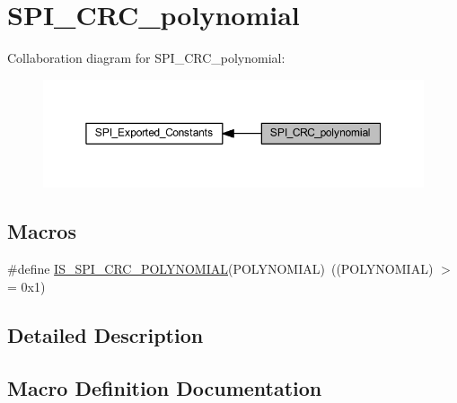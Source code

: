 \hypertarget{group___s_p_i___c_r_c__polynomial}{}\section{S\+P\+I\+\_\+\+C\+R\+C\+\_\+polynomial}
\label{group___s_p_i___c_r_c__polynomial}
Collaboration diagram for S\+P\+I\+\_\+\+C\+R\+C\+\_\+polynomial\+:
\nopagebreak
\begin{figure}[H]
\begin{center}
\leavevmode
\includegraphics[width=350pt]{group___s_p_i___c_r_c__polynomial}
\end{center}
\end{figure}
\subsection*{Macros}
\begin{DoxyCompactItemize}
\item 
\#define \hyperlink{group___s_p_i___c_r_c__polynomial_ga76eec5bbb44c873aa52966a9cb6c8f8c}{I\+S\+\_\+\+S\+P\+I\+\_\+\+C\+R\+C\+\_\+\+P\+O\+L\+Y\+N\+O\+M\+I\+AL}(P\+O\+L\+Y\+N\+O\+M\+I\+AL)~((P\+O\+L\+Y\+N\+O\+M\+I\+AL) $>$= 0x1)
\end{DoxyCompactItemize}


\subsection{Detailed Description}


\subsection{Macro Definition Documentation}
\mbox{\label{group___s_p_i___c_r_c__polynomial_ga76eec5bbb44c873aa52966a9cb6c8f8c}} 
